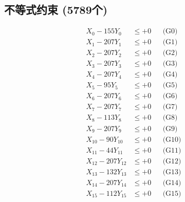 \documentclass[a4paper,10pt]{article}
\begin{document}
\subsection{不等式约束 (5789个)}

\allowdisplaybreaks
{\small
\begin{align}
\allowbreak
\allowbreak
\allowbreak
\allowbreak
\allowbreak
\allowbreak
\allowbreak
\allowbreak
\allowbreak
\allowbreak
\allowbreak
\allowbreak
\allowbreak
\allowbreak
\allowbreak
\allowbreak
\allowbreak
\allowbreak
\allowbreak
\allowbreak
\allowbreak
\allowbreak
\allowbreak
\allowbreak
\allowbreak
\allowbreak
\allowbreak
\allowbreak
\allowbreak
\allowbreak
\allowbreak
\allowbreak
\allowbreak
\allowbreak
\allowbreak
\allowbreak
\allowbreak
\allowbreak
\allowbreak
\allowbreak
\allowbreak
\allowbreak
\allowbreak
\allowbreak
\allowbreak
\allowbreak
\allowbreak
\allowbreak
\allowbreak
\allowbreak
\allowbreak
\allowbreak
\allowbreak
\allowbreak
\allowbreak
\allowbreak
\allowbreak
\allowbreak
\allowbreak
\allowbreak
\allowbreak
\allowbreak
\allowbreak
\allowbreak
\allowbreak
\allowbreak
\allowbreak
\allowbreak
\allowbreak
\allowbreak
\allowbreak
\allowbreak
\allowbreak
\allowbreak
\allowbreak
\allowbreak
\allowbreak
\allowbreak
X_{0} - 155Y_{0} &\leq +0 && \text{(G0)} \\
\allowbreak
X_{1} - 207Y_{1} &\leq +0 && \text{(G1)} \\
X_{2} - 207Y_{2} &\leq +0 && \text{(G2)} \\
X_{3} - 207Y_{3} &\leq +0 && \text{(G3)} \\
X_{4} - 207Y_{4} &\leq +0 && \text{(G4)} \\
X_{5} - 95Y_{5} &\leq +0 && \text{(G5)} \\
X_{6} - 207Y_{6} &\leq +0 && \text{(G6)} \\
X_{7} - 207Y_{7} &\leq +0 && \text{(G7)} \\
X_{8} - 113Y_{8} &\leq +0 && \text{(G8)} \\
X_{9} - 207Y_{9} &\leq +0 && \text{(G9)} \\
X_{10} - 90Y_{10} &\leq +0 && \text{(G10)} \\
\allowbreak
X_{11} - 44Y_{11} &\leq +0 && \text{(G11)} \\
X_{12} - 207Y_{12} &\leq +0 && \text{(G12)} \\
X_{13} - 132Y_{13} &\leq +0 && \text{(G13)} \\
X_{14} - 207Y_{14} &\leq +0 && \text{(G14)} \\
X_{15} - 112Y_{15} &\leq +0 && \text{(G15)} \\

\end{align}}
\end{document}
